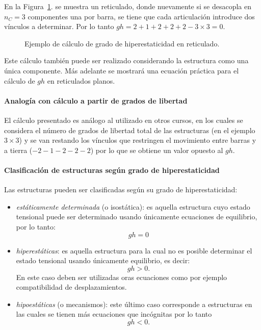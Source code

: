 En la Figura~\ref{fig:ejemghMed}. se muestra un reticulado, donde nuevamente si se desacopla en $n_C=3$ componentes una por barra, se tiene que cada articulación introduce dos vínculos a determinar. Por lo tanto $gh = 2+1+2+2+2-3\times 3 = 0$.

\begin{figure}[htb]
	\centering
	\def\svgwidth{0.6\textwidth}
	
	\caption{Ejemplo de cálculo de grado de hiperestaticidad en reticulado.}
	\label{fig:ejemghMed}
\end{figure}

Este cálculo también puede ser realizado considerando la estructura como una única componente. Más adelante se mostrará una ecuación práctica para el cálculo de $gh$ en reticulados planos.

\paragraph{Analogía con cálculo a partir de grados de libertad} %
El cálculo presentado es análogo al utilizado en otros cursos, en los cuales se considera el número de grados de libertad total de las estructuras (en el ejemplo $3\times 3$) y se van restando los vínculos que restringen el movimiento entre barras y a tierra ($-2-1-2-2-2$) por lo que se obtiene un valor opuesto al $gh$.

\paragraph{Clasificación de estructuras según grado de hiperestaticidad} %
Las estructuras pueden ser clasificadas según su grado de hiperestaticidad:
\begin{itemize}
	\item \textit{estáticamente determinada} (o isostática): es aquella estructura cuyo estado tensional puede ser determinado usando únicamente ecuaciones de equilibrio, por lo tanto:
	$$
	gh = 0
	$$
	
	\item \textit{hiperestáticas}: es aquella estructura para la cual no es posible determinar el estado tensional usando únicamente equilibrio, es decir:
	$$
	gh > 0.
	$$
	En este caso deben ser utilizadas oras ecuaciones como por ejemplo compatibilidad de desplazamientos. %
	
	\item \textit{hipoestáticas} (o mecanismos): este último caso corresponde a estructuras en las cuales se tienen más ecuaciones que incógnitas por lo tanto
	$$
	gh <0.
	$$
\end{itemize}



